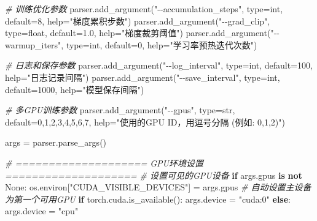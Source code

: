 \documentclass[
]{article}
\newenvironment{Shaded}{}{}
\newcommand{\BuiltInTok}[1]{\textcolor[rgb]{0.00,0.50,0.00}{#1}}
\newcommand{\CommentTok}[1]{\textcolor[rgb]{0.38,0.63,0.69}{\textit{#1}}}
\newcommand{\ControlFlowTok}[1]{\textcolor[rgb]{0.00,0.44,0.13}{\textbf{#1}}}
\newcommand{\DecValTok}[1]{\textcolor[rgb]{0.25,0.63,0.44}{#1}}
\newcommand{\FloatTok}[1]{\textcolor[rgb]{0.25,0.63,0.44}{#1}}
\newcommand{\KeywordTok}[1]{\textcolor[rgb]{0.00,0.44,0.13}{\textbf{#1}}}
\newcommand{\NormalTok}[1]{#1}
\newcommand{\OperatorTok}[1]{\textcolor[rgb]{0.40,0.40,0.40}{#1}}
\newcommand{\StringTok}[1]{\textcolor[rgb]{0.25,0.44,0.63}{#1}}
\newcommand{\VariableTok}[1]{\textcolor[rgb]{0.10,0.09,0.49}{#1}}
\begin{document}
\begin{Shaded}
\begin{Highlighting}[]
    \CommentTok{\# 训练优化参数}
\NormalTok{    parser.add\_argument(}\StringTok{"{-}{-}accumulation\_steps"}\NormalTok{, }\BuiltInTok{type}\OperatorTok{=}\BuiltInTok{int}\NormalTok{, default}\OperatorTok{=}\DecValTok{8}\NormalTok{, }\BuiltInTok{help}\OperatorTok{=}\StringTok{"梯度累积步数"}\NormalTok{)}
\NormalTok{    parser.add\_argument(}\StringTok{"{-}{-}grad\_clip"}\NormalTok{, }\BuiltInTok{type}\OperatorTok{=}\BuiltInTok{float}\NormalTok{, default}\OperatorTok{=}\FloatTok{1.0}\NormalTok{, }\BuiltInTok{help}\OperatorTok{=}\StringTok{"梯度裁剪阈值"}\NormalTok{)}
\NormalTok{    parser.add\_argument(}\StringTok{"{-}{-}warmup\_iters"}\NormalTok{, }\BuiltInTok{type}\OperatorTok{=}\BuiltInTok{int}\NormalTok{, default}\OperatorTok{=}\DecValTok{0}\NormalTok{, }\BuiltInTok{help}\OperatorTok{=}\StringTok{"学习率预热迭代次数"}\NormalTok{)}
    
    \CommentTok{\# 日志和保存参数}
\NormalTok{    parser.add\_argument(}\StringTok{"{-}{-}log\_interval"}\NormalTok{, }\BuiltInTok{type}\OperatorTok{=}\BuiltInTok{int}\NormalTok{, default}\OperatorTok{=}\DecValTok{100}\NormalTok{, }\BuiltInTok{help}\OperatorTok{=}\StringTok{"日志记录间隔"}\NormalTok{)}
\NormalTok{    parser.add\_argument(}\StringTok{"{-}{-}save\_interval"}\NormalTok{, }\BuiltInTok{type}\OperatorTok{=}\BuiltInTok{int}\NormalTok{, default}\OperatorTok{=}\DecValTok{1000}\NormalTok{, }\BuiltInTok{help}\OperatorTok{=}\StringTok{"模型保存间隔"}\NormalTok{)}
    
    \CommentTok{\# 多GPU训练参数}
\NormalTok{    parser.add\_argument(}\StringTok{"{-}{-}gpus"}\NormalTok{, }\BuiltInTok{type}\OperatorTok{=}\BuiltInTok{str}\NormalTok{, default}\OperatorTok{=}\StringTok{\textquotesingle{}0,1,2,3,4,5,6,7\textquotesingle{}}\NormalTok{, }\BuiltInTok{help}\OperatorTok{=}\StringTok{"使用的GPU ID，用逗号分隔 (例如: \textquotesingle{}0,1,2\textquotesingle{})"}\NormalTok{)}

\NormalTok{    args }\OperatorTok{=}\NormalTok{ parser.parse\_args()}

    \CommentTok{\# ==================== GPU环境设置 ====================}
    \CommentTok{\# 设置可见的GPU设备}
    \ControlFlowTok{if}\NormalTok{ args.gpus }\KeywordTok{is} \KeywordTok{not} \VariableTok{None}\NormalTok{:}
\NormalTok{        os.environ[}\StringTok{"CUDA\_VISIBLE\_DEVICES"}\NormalTok{] }\OperatorTok{=}\NormalTok{ args.gpus}
        \CommentTok{\# 自动设置主设备为第一个可用GPU}
        \ControlFlowTok{if}\NormalTok{ torch.cuda.is\_available():}
\NormalTok{            args.device }\OperatorTok{=} \StringTok{"cuda:0"}
        \ControlFlowTok{else}\NormalTok{:}
\NormalTok{            args.device }\OperatorTok{=} \StringTok{"cpu"}


\end{Highlighting}
\end{Shaded}
\end{document}
